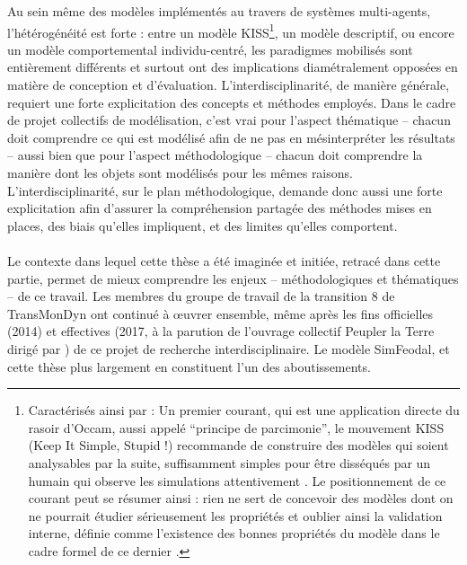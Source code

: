 Au sein même des modèles implémentés au travers de systèmes multi-agents, l'hétérogénéité est forte : entre un modèle KISS\footnote{
Caractérisés ainsi par \textcite[110]{amblard_evaluation_2006} : 
	\og Un premier courant, qui est une application directe du rasoir d'Occam, aussi appelé  ``principe de parcimonie'', le mouvement KISS (Keep It Simple, Stupid !) recommande de construire des modèles qui soient analysables par la suite, suffisamment simples pour être disséqués par un humain qui observe les simulations attentivement \textelp{}.
	Le positionnement de ce courant peut se résumer ainsi : rien ne sert de concevoir des modèles dont on ne pourrait étudier sérieusement les propriétés et oublier ainsi la validation interne, définie comme l'existence des bonnes propriétés du modèle dans le cadre formel de ce dernier
	\fg{}.
}, un modèle descriptif, ou encore un modèle comportemental individu-centré, les paradigmes mobilisés sont entièrement différents et surtout ont des implications diamétralement opposées en matière de conception et d'évaluation.
L'interdisciplinarité, de manière générale, requiert une forte explicitation des concepts et méthodes employés.
Dans le cadre de projet collectifs de modélisation, c'est vrai pour l'aspect thématique -- chacun doit comprendre ce qui est modélisé afin de ne pas en mésinterpréter les résultats -- aussi bien que pour l'aspect méthodologique -- chacun doit comprendre la manière dont les objets sont modélisés pour les mêmes raisons.
L'interdisciplinarité, sur le plan méthodologique, demande donc aussi une forte explicitation afin d'assurer la compréhension partagée des méthodes mises en places, des biais qu'elles impliquent, et des limites qu'elles comportent.

%

\bigskip
\paragraph[Conclusion intermédiaire]{}

Le contexte dans lequel cette thèse a été imaginée et initiée, retracé dans cette partie, permet de mieux comprendre les enjeux -- méthodologiques et thématiques -- de ce travail.
Les membres du groupe de travail de la \og transition 8\fg{} de TransMonDyn ont continué à œuvrer ensemble, même après les fins officielles (2014) et effectives (2017, à la parution de l'ouvrage collectif \og Peupler la Terre\fg{} dirigé par \textcite{sanders2018peupler}) de ce projet de recherche interdisciplinaire.
Le modèle SimFeodal, et cette thèse plus largement en constituent l'un des aboutissements.

